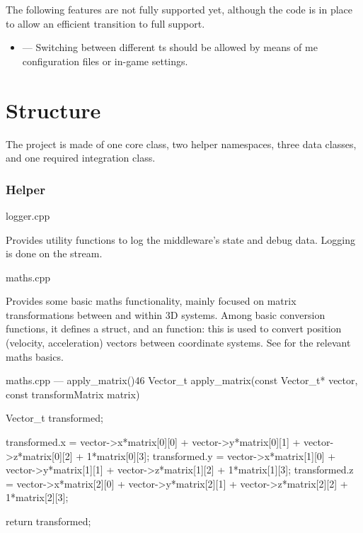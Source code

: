The following \glspl{feature} are not fully supported yet, although the code is in place to allow an efficient transition to full support.

\begin{itemize}
	\item {} --- Switching between different \gls{ts} should be allowed by means of \gls{me} configuration files or in-game settings.
\end{itemize}

\section{Structure}\label{sc:middleware:structure}

The project is made of one core class, two helper namespaces, three data classes, and one required integration class.

\subsubsection{Helper}

\begin{filelist}
	logger.cpp
\end{filelist}

Provides utility functions to log the \gls{middleware}'s state and debug data. Logging is done on the  stream.

\begin{filelist}
	maths.cpp
\end{filelist}

Provides some basic maths functionality, mainly focused on matrix transformations between and within 3D systems. Among basic conversion functions, it defines a  struct, and an  function: this is used to convert position (velocity, acceleration) vectors between coordinate systems. See  for the relevant maths basics.

\begin{codelist}{maths.cpp --- apply\_matrix()}{46}
	Vector_t apply_matrix(const Vector_t* vector, const transformMatrix matrix) {
		Vector_t transformed;

		transformed.x = vector->x*matrix[0][0] + vector->y*matrix[0][1] +
						vector->z*matrix[0][2] + 1*matrix[0][3];
		transformed.y = vector->x*matrix[1][0] + vector->y*matrix[1][1] +
						vector->z*matrix[1][2] + 1*matrix[1][3];
		transformed.z = vector->x*matrix[2][0] + vector->y*matrix[2][1] +
						vector->z*matrix[2][2] + 1*matrix[2][3];

		return transformed;
	}
\end{codelist}

